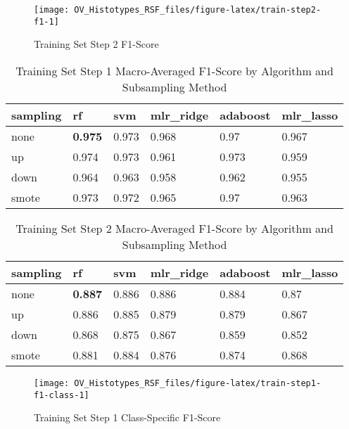 \documentclass[
]{report}
\begin{document}
\begin{figure}[H]

{\centering \texttt{[image: OV\_Histotypes\_RSF\_files/figure-latex/train-step2-f1-1]} 

}

\caption{Training Set Step 2 F1-Score}\label{fig:train-step2-f1}
\end{figure}

\begin{table}

\caption{\label{tab:train-step1-f1-table}Training Set Step 1 Macro-Averaged F1-Score by Algorithm and Subsampling Method}
\centering
\begin{tabular}[t]{l|l|l|l|l|l}
\hline
sampling & rf & svm & mlr\_ridge & adaboost & mlr\_lasso\\
\hline
none & \textbf{0.975} & 0.973 & 0.968 & 0.97 & 0.967\\
\hline
up & 0.974 & 0.973 & 0.961 & 0.973 & 0.959\\
\hline
down & 0.964 & 0.963 & 0.958 & 0.962 & 0.955\\
\hline
smote & 0.973 & 0.972 & 0.965 & 0.97 & 0.963\\
\hline
\end{tabular}
\end{table}

\begin{table}

\caption{\label{tab:train-step2-f1-table}Training Set Step 2 Macro-Averaged F1-Score by Algorithm and Subsampling Method}
\centering
\begin{tabular}[t]{l|l|l|l|l|l}
\hline
sampling & rf & svm & mlr\_ridge & adaboost & mlr\_lasso\\
\hline
none & \textbf{0.887} & 0.886 & 0.886 & 0.884 & 0.87\\
\hline
up & 0.886 & 0.885 & 0.879 & 0.879 & 0.867\\
\hline
down & 0.868 & 0.875 & 0.867 & 0.859 & 0.852\\
\hline
smote & 0.881 & 0.884 & 0.876 & 0.874 & 0.868\\
\hline
\end{tabular}
\end{table}

\begin{figure}[H]

{\centering \texttt{[image: OV\_Histotypes\_RSF\_files/figure-latex/train-step1-f1-class-1]} 

}

\caption{Training Set Step 1 Class-Specific F1-Score}\label{fig:train-step1-f1-class}
\end{figure}
\end{document}
